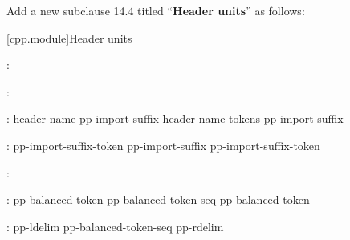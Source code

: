 Add a new subclause 14.4 titled ``\textbf{Header units}'' as follows:

\setcounter{section}{3}
[cpp.module]{Header units}%

\begin{std.txt}
\color{addclr}
\begin{bnf}
:\br
  \opt{} \opt{} 
\end{bnf}

\begin{bnf}
:\br
\end{bnf}

\begin{bnf}
:\br
   header-name pp-import-suffix\opt{} \terminal{;}\br
   header-name-tokens pp-import-suffix\opt{} \terminal{;}
\end{bnf}

\begin{bnf}
:\br
  pp-import-suffix-token\br
  pp-import-suffix pp-import-suffix-token
\end{bnf}

\begin{bnf}
:\br
\end{bnf}

\begin{bnf}
:\br
  pp-balanced-token\br
  pp-balanced-token-seq pp-balanced-token
\end{bnf}

\begin{bnf}
:\br
  pp-ldelim pp-balanced-token-seq\opt{} pp-rdelim\br
\end{bnf}

\begin{bnf}
 \br
  \terminal{(    [    \{    <:    <\%}
\end{bnf}

\begin{bnf}
 \br
  \terminal{)    ]    \}    :>    \%>}
\end{bnf}


\end{std.txt}
